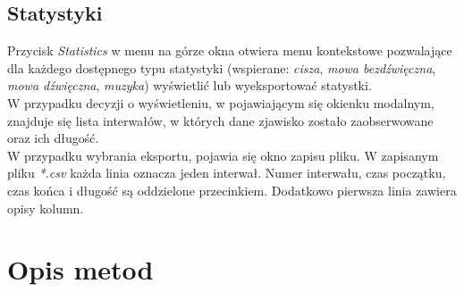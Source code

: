 \documentclass[a4paper]{article}
\begin{document}
\subsection{Statystyki}
Przycisk \textit{Statistics} w menu na górze okna otwiera menu kontekstowe pozwalające dla każdego dostępnego typu statystyki (wspierane: \textit{cisza}, \textit{mowa bezdźwięczna}, \textit{mowa dźwięczna}, \textit{muzyka}) wyświetlić lub wyeksportować statystki.\\
W przypadku decyzji o wyświetleniu, w pojawiającym się okienku modalnym, znajduje się lista interwałów, w których dane zjawisko zostało zaobserwowane oraz ich długość.\\
W przypadku wybrania eksportu, pojawia się okno zapisu pliku. W zapisanym pliku \textit{*.csv} każda linia oznacza jeden interwał. Numer interwału, czas początku, czas końca i długość są oddzielone przecinkiem. Dodatkowo pierwsza linia zawiera opisy kolumn.

\section{Opis metod}
\end{document}
